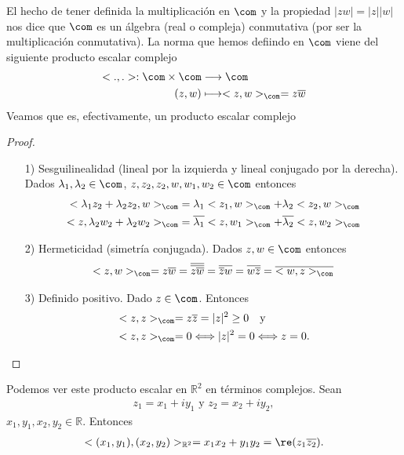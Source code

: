 El hecho de tener definida la multiplicación en $\com$ y la propiedad $|zw| = |z||w|$ nos dice que $\com$ es un álgebra (real o compleja) conmutativa (por ser la multiplicación conmutativa). La norma que hemos defiindo en $\com$ viene del siguiente producto escalar complejo
\begin{align*}
    <.,.> : \com \times \com &\longrightarrow \com \\
    (z,w) &\longmapsto <z,w>_{\com} = z\overline{w}
\end{align*}
Veamos que es, efectivamente, un producto escalar complejo
\begin{proof}
\begin{enumerate}
    \item[1)] Sesguilinealidad (lineal por la izquierda y lineal conjugado por la derecha). Dados $\lambda_1, \lambda_2 \in \com$, $z,z_2,z_2,w,w_1,w_2 \in \com$ entonces
    \begin{align*}
        <\lambda_1z_2 + \lambda_2z_2,w>_{\com} &= \lambda_1<z_1,w>_{\com} + \lambda_2<z_2,w>_{\com} \\
        <z,\lambda_2w_2 + \lambda_2w_2>_{\com} &= \overline{\lambda_1}<z,w_1>_{\com} + \overline{\lambda_2}<z,w_2>_{\com}
    \end{align*}
    \item[2)] Hermeticidad (simetría conjugada). Dados $z,w \in \com$ entonces
    \begin{align*}
        <z,w>_{\com} = z\overline{w} = \overline{\overline{z\overline{w}}} = \overline{\overline{z}w} = \overline{w\overline{z}} = \overline{<w,z>_{\com}}
    \end{align*}
    \item[3)] Definido positivo. Dado $z \in \com$. Entonces
    \begin{align*}
        &<z,z>_{\com} = z\overline{z} = |z|^2 \ge 0 \ \ \ \text{y} \\
        &<z,z>_{\com} = 0 \Longleftrightarrow |z|^2 = 0 \Longleftrightarrow z = 0.
    \end{align*}
\end{enumerate}
\end{proof}
Podemos ver este producto escalar en $\mathbb{R}^2$ en términos complejos. Sean 
\begin{align*}
    z_1 = x_1 + iy_1 \text{ \ \ \ y \ \ \ } z_2 = x_2 + iy_2,
\end{align*}
$x_1,y_1,x_2,y_2 \in \mathbb{R}$. Entonces
\begin{align*}
    <(x_1,y_1), (x_2,y_2)>_{\mathbb{R}^2} = x_1x_2 + y_1y_2 = \re(z_1\overline{z_2}).
\end{align*}
